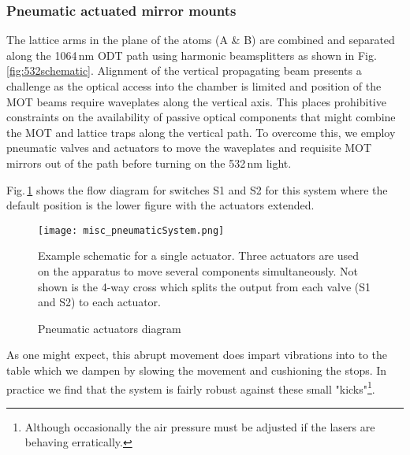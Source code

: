 \subsubsection{Pneumatic actuated mirror mounts}
The lattice arms in the plane of the atoms (A \& B) are combined and separated along the 1064\,nm ODT path using harmonic beamsplitters as shown in Fig.\,\ref{fig:532schematic}.
Alignment of the vertical propagating beam presents a challenge as the optical access into the chamber is limited and position of the MOT beams require waveplates along the vertical axis. %
This places prohibitive constraints on the availability of passive optical components that might combine the MOT and lattice traps along the vertical path.
To overcome this, we employ pneumatic valves and actuators to move the waveplates and requisite MOT mirrors out of the path before turning on the 532\,nm light.

Fig.\,\ref{fig:pnuSys} shows the flow diagram for switches S1 and S2 for this system where the default position is the lower figure with the actuators extended.
	\begin{figure}
		\centerline{
		\texttt{[image: misc\_pneumaticSystem.png]}}
		\caption{Pneumatic actuators diagram}{Example schematic for a single actuator. Three actuators are used on the apparatus to move several components simultaneously. Not shown is the 4-way cross which splits the output from each valve (S1 and S2) to each actuator.}
		\label{fig:pnuSys}
	\end{figure}
As one might expect, this abrupt movement does impart vibrations into to the table which we dampen by slowing the movement and cushioning the stops.
In practice we find that the system is fairly robust against these small "kicks"\footnote{Although occasionally the air pressure must be adjusted if the lasers are behaving erratically.}.
